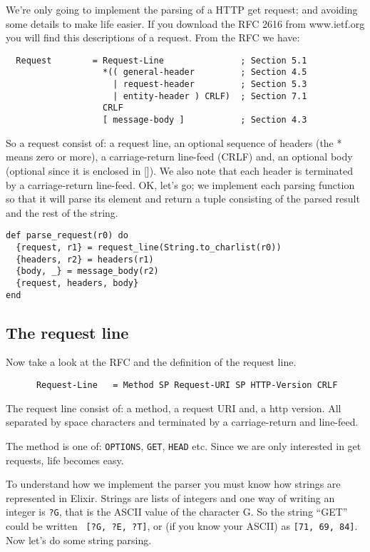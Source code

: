 \documentclass[a4paper,11pt]{article}
\begin{document}
We're only going to implement the parsing of a HTTP get request; and
avoiding some details to make life easier. If you download the RFC 2616 from
www.ietf.org you will find this descriptions of a request. From the RFC we have:

\begin{verbatim}
  Request        = Request-Line               ; Section 5.1
                   *(( general-header         ; Section 4.5
                     | request-header         ; Section 5.3
                     | entity-header ) CRLF)  ; Section 7.1
                   CRLF
                   [ message-body ]           ; Section 4.3
\end{verbatim}

So a request consist of: a request line, an optional sequence of
headers (the * means zero or more), a carriage-return line-feed (CRLF)
and, an optional body (optional since it is enclosed in []). We also
note that each header is terminated by a carriage-return
line-feed. OK, let's go; we implement each parsing function so that it
will parse its element and return a tuple consisting of the parsed
result and the rest of the string.

\begin{verbatim}
def parse_request(r0) do
  {request, r1} = request_line(String.to_charlist(r0))
  {headers, r2} = headers(r1)
  {body, _} = message_body(r2)
  {request, headers, body}
end
\end{verbatim}

\subsection{The request line}
Now take a look at the RFC and the definition of the request line.

\begin{verbatim}
      Request-Line   = Method SP Request-URI SP HTTP-Version CRLF
\end{verbatim}

The request line consist of: a method, a request URI and, a http
version. All separated by space characters and terminated by a
carriage-return and line-feed.

The method is one of: {\tt OPTIONS}, {\tt GET}, {\tt HEAD} etc. Since we
are only interested in get requests, life becomes easy.

To understand how we implement the parser you must know how strings
are represented in Elixir. Strings are lists of integers and one way
of writing an integer is {\tt ?G}, that is the ASCII value of the
character G. So the string ``GET'' could be written {\tt
  [?G, ?E, ?T]}, or (if you know your ASCII) as {\tt [71, 69, 84]}. Now
let's do some string parsing.
\end{document}
